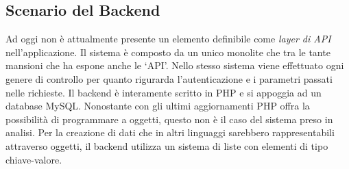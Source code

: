 \subsection{Scenario del Backend}
Ad oggi non è attualmente presente un elemento definibile come \emph{layer di API} nell’applicazione. Il sistema è composto da un unico monolite che tra le tante mansioni che ha espone anche le `API'. Nello stesso sistema viene effettuato ogni genere di controllo per quanto rigurarda l'autenticazione e i parametri passati nelle richieste. Il backend è interamente scritto in PHP e si appoggia ad un database MySQL. Nonostante con gli ultimi aggiornamenti PHP offra la possibilità di programmare a oggetti, questo non è il caso del sistema preso in analisi. Per la creazione di dati che in altri linguaggi sarebbero rappresentabili attraverso oggetti, il backend utilizza un sistema di liste con elementi di tipo chiave-valore.






